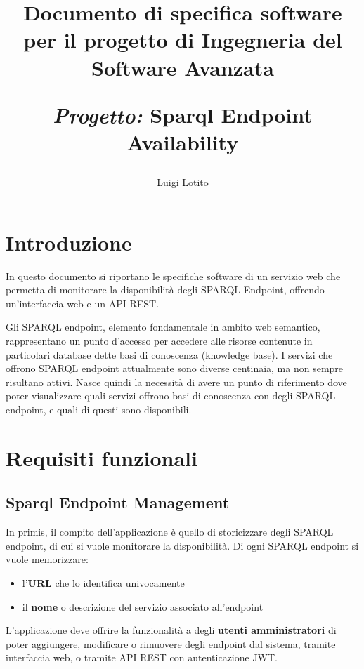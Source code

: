 \documentclass{article}
\title{Documento di specifica software per il progetto di Ingegneria del Software Avanzata\par
    \textit{Progetto:} \textbf{Sparql Endpoint Availability}\\}
\author{Luigi Lotito}
\date{}
\begin{document}
\maketitle
\clearpage

\tableofcontents
\clearpage

\section{Introduzione}
\label{sec:introduzione}

In questo documento si riportano le specifiche software di un servizio web che permetta
di monitorare la disponibilità degli SPARQL Endpoint, offrendo un'interfaccia web e un API REST.

Gli SPARQL endpoint, elemento fondamentale in ambito web semantico, rappresentano
un punto d'accesso per accedere  alle risorse contenute in particolari database dette basi di conoscenza (knowledge base).
I servizi che offrono SPARQL endpoint attualmente sono diverse centinaia, ma non sempre risultano attivi.
Nasce quindi la necessità di avere un punto di riferimento dove poter visualizzare
quali servizi offrono basi di conoscenza con degli SPARQL endpoint, e quali di questi sono disponibili.


\section{Requisiti funzionali}
\label{sec:requisiti_funzionali}

\subsection{Sparql Endpoint Management}

In primis, il compito dell'applicazione è quello di storicizzare degli SPARQL endpoint, di cui si vuole monitorare la disponibilità.
Di ogni SPARQL endpoint si vuole memorizzare:
\begin{itemize}
    \item l'\textbf{URL} che lo identifica univocamente
    \item il \textbf{nome} o descrizione del servizio associato all'endpoint
\end{itemize}

L'applicazione deve offrire la funzionalità a degli \textbf{utenti amministratori} di poter aggiungere, modificare o rimuovere degli endpoint
dal sistema, tramite interfaccia web, o tramite API REST con autenticazione JWT.
\end{document}
